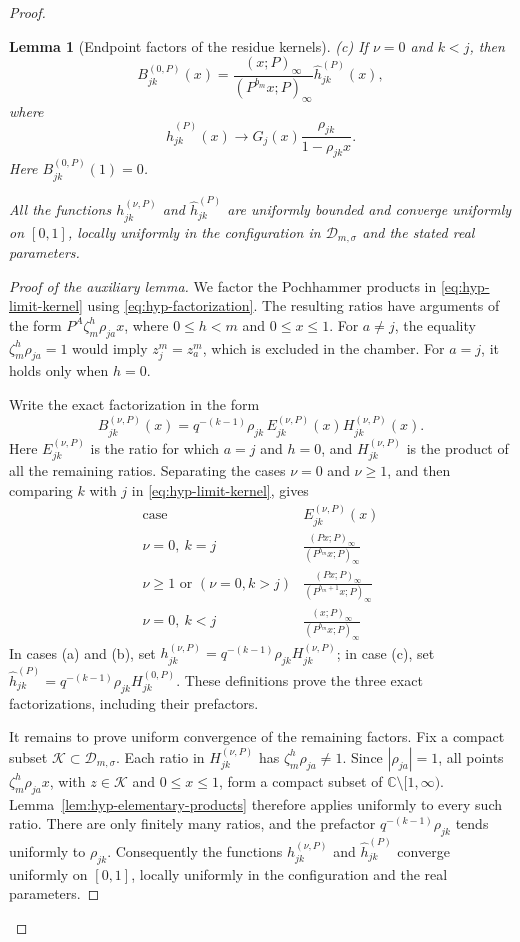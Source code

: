 \documentclass[12pt]{amsart}
\newtheorem{lem}[thm]{Lemma}
\theoremstyle{definition}
\numberwithin{equation}{section}
\theoremstyle{definition}
\let\mc\mathcal
\let\si\sigma
\let\ge\geqslant
\let\le\leqslant
\def\C{{\mathbb C}}
\def\beq{\begin{equation}}
\def\eeq{\end{equation}}
\begin{document}
\begin{proof}
\begin{lem}[Endpoint factors of the residue kernels]
\emph{(c)} If $\nu=0$ and $k<j$, then
\beq\label{eq:hyp-endpoint-shifted}
 B_{jk}^{(0,P)}(x)=
 \frac{(x;P)_\infty}{(P^{b_m}x;P)_\infty}
 \widehat h_{jk}^{(P)}(x),
\eeq
where
\[
 \widehat h_{jk}^{(P)}(x)\longrightarrow
 G_j(x)\frac{\rho_{jk}}{1-\rho_{jk}x}.
\]
Here $B_{jk}^{(0,P)}(1)=0$.

All the functions $h_{jk}^{(\nu,P)}$ and
$\widehat h_{jk}^{(P)}$ are uniformly bounded and
converge uniformly on $[0,1]$, locally uniformly in the
configuration in $\mc D_{m,\si}$ and the stated real parameters.
\end{lem}

\begin{proof}[Proof of the auxiliary lemma]
We factor the Pochhammer products in
\eqref{eq:hyp-limit-kernel} using
\eqref{eq:hyp-factorization}. The resulting ratios have
arguments of the form $P^A\zeta_m^h\rho_{ja}x$,
where $0\le h<m$ and $0\le x\le1$.
For $a\ne j$, the equality $\zeta_m^h\rho_{ja}=1$
would imply $z_j^m=z_a^m$, which is excluded in the chamber.
For $a=j$, it holds only when $h=0$.

Write the exact factorization in the form
\[
 B_{jk}^{(\nu,P)}(x)
 =q^{-(k-1)}\rho_{jk}\,
 E_{jk}^{(\nu,P)}(x)H_{jk}^{(\nu,P)}(x).
\]
Here $E_{jk}^{(\nu,P)}$ is the ratio for which $a=j$ and
$h=0$, and $H_{jk}^{(\nu,P)}$ is the product of all the
remaining ratios. Separating the cases $\nu=0$ and $\nu\ge1$,
and then comparing $k$ with $j$ in
\eqref{eq:hyp-limit-kernel}, gives
\[
 \begin{array}{c|c}
 \text{case}&E_{jk}^{(\nu,P)}(x)\\ \hline
 \nu=0,\ k=j
    &\displaystyle\frac{(Px;P)_\infty}
                            {(P^{b_m}x;P)_\infty}\\[9pt]
 \nu\ge1\text{ or }(\nu=0,k>j)
    &\displaystyle\frac{(Px;P)_\infty}
                            {(P^{b_m+1}x;P)_\infty}\\[9pt]
 \nu=0,\ k<j
    &\displaystyle\frac{(x;P)_\infty}
                            {(P^{b_m}x;P)_\infty}
 \end{array}
\]
In cases (a) and (b), set
$h_{jk}^{(\nu,P)}=q^{-(k-1)}\rho_{jk}H_{jk}^{(\nu,P)}$;
in case (c), set
$\widehat h_{jk}^{(P)}=q^{-(k-1)}\rho_{jk}H_{jk}^{(0,P)}$.
These definitions prove the three exact factorizations,
including their prefactors.

It remains to prove uniform convergence of the remaining
factors. Fix a compact subset $\mc K\subset\mc D_{m,\si}$.
Each ratio in $H_{jk}^{(\nu,P)}$ has
$\zeta_m^h\rho_{ja}\ne1$. Since $|\rho_{ja}|=1$,
all points $\zeta_m^h\rho_{ja}x$, with $z\in\mc K$
and $0\le x\le1$, form a compact subset of
$\C\setminus[1,\infty)$. Lemma~\ref{lem:hyp-elementary-products}
therefore applies uniformly to every such ratio.
There are only finitely many ratios, and the prefactor
$q^{-(k-1)}\rho_{jk}$ tends uniformly to $\rho_{jk}$.
Consequently the functions $h_{jk}^{(\nu,P)}$ and
$\widehat h_{jk}^{(P)}$ converge uniformly on $[0,1]$,
locally uniformly in the configuration and the real parameters.


\end{proof}
\end{proof}
\end{document}
